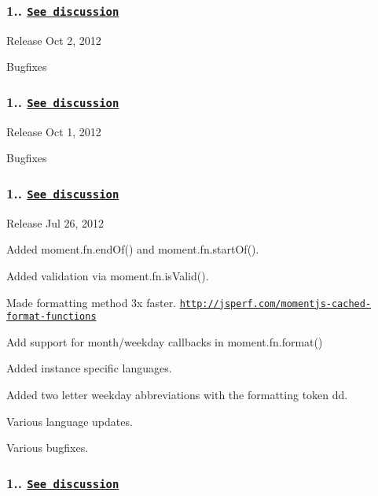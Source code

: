 \subsubsection*{1.. \href{https://github.com/timrwood/moment/issues/456}{\tt See discussion}}


\begin{DoxyItemize}
\item Release Oct 2, 2012
\end{DoxyItemize}

Bugfixes

\subsubsection*{1.. \href{https://github.com/timrwood/moment/issues/384}{\tt See discussion}}


\begin{DoxyItemize}
\item Release Oct 1, 2012
\end{DoxyItemize}

Bugfixes

\subsubsection*{1.. \href{https://github.com/timrwood/moment/issues/288}{\tt See discussion}}


\begin{DoxyItemize}
\item Release Jul 26, 2012
\end{DoxyItemize}

Added {\ttfamily moment.\+fn.\+end\+Of()} and {\ttfamily moment.\+fn.\+start\+Of()}.

Added validation via {\ttfamily moment.\+fn.\+is\+Valid()}.

Made formatting method 3x faster. \href{http://jsperf.com/momentjs-cached-format-functions}{\tt http\+://jsperf.\+com/momentjs-\/cached-\/format-\/functions}

Add support for month/weekday callbacks in {\ttfamily moment.\+fn.\+format()}

Added instance specific languages.

Added two letter weekday abbreviations with the formatting token {\ttfamily dd}.

Various language updates.

Various bugfixes.

\subsubsection*{1.. \href{https://github.com/timrwood/moment/pull/268}{\tt See discussion}}


